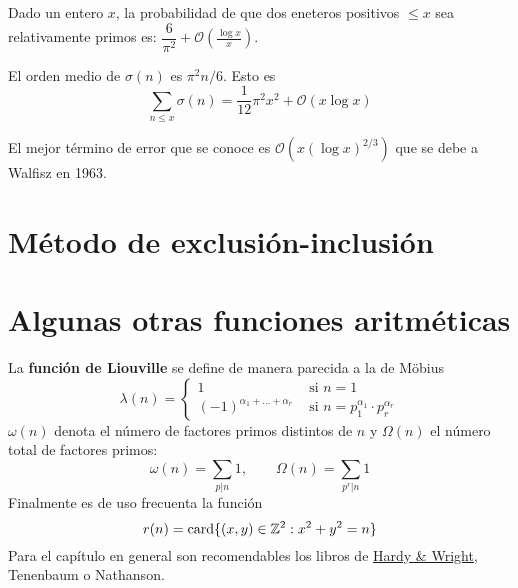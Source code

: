 \documentclass[TAN.tex]{subfiles}
\begin{document}
\begin{coro} Dado un entero $x$, la probabilidad de que dos eneteros positivos $≤x$ sea relativamente primos es: $\dfrac{6}{π^2}+ \mathcal{O}\left(\frac{\log x}{x}\right)$.
\end{coro}

\begin{prop}
El orden medio de $σ(n)$ es $π^2n/6$. Esto es
\[ \sum_{n≤x} σ(n) = \frac{1}{12} π^2x^2 + \mathcal{O}(x\log x) \]
\end{prop}
El mejor término de error que se conoce es $\mathcal{O}(x(\log x)^{2/3})$ que se debe a Walfisz en 1963.

\section{Método de exclusión-inclusión}
\section{Algunas otras funciones aritméticas}
La \textbf{función de Liouville} se define de manera parecida a la de Möbius
\[ λ(n) = \begin{cases}
	1 &\text{ si }n=1\\
	(-1)^{α_1+\dots+α_r} &\text{ si }n=p_1^{α_1}\cdot p_r^{α_r}
\end{cases} \]
$ω(n)$ denota el número de factores primos distintos de $n$ y $Ω(n)$ el número total de factores primos:
\[ ω(n) = \sum_{p|n} 1, \qquad Ω(n) = \sum_{p^r|n} 1 \]
Finalmente es de uso frecuenta la función
\[ r(n) = \text{card}\{(x,y) \in \mathbb{Z}^2 : x^2+y^2=n\} \]
Para el capítulo en general son recomendables los libros de \href{https://leonettipaolo.files.wordpress.com/2012/07/ebook-english-g-h-hardy-an-introduction-to-the-theory-of-numbers.pdf}{Hardy \& Wright}, Tenenbaum o Nathanson.
\end{document}
